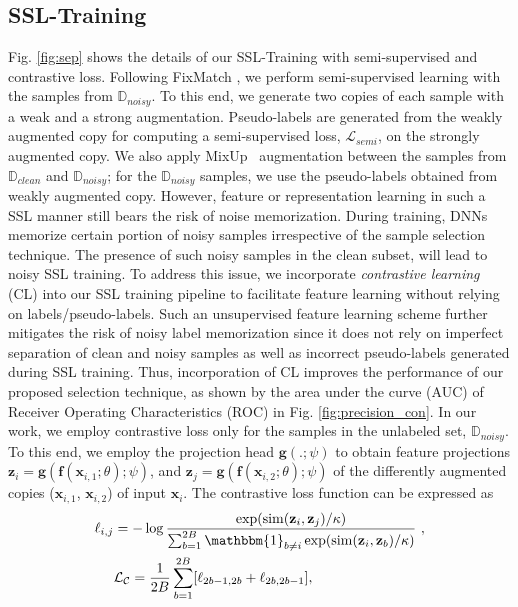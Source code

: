 \documentclass[10pt,twocolumn,letterpaper]{article}
\begin{document}
\subsection{SSL-Training}
\label{sec:ssl_train}
Fig. \ref{fig:sep} shows the details of our SSL-Training with semi-supervised and contrastive loss. Following FixMatch \cite{sohn2020fixmatch}, we perform semi-supervised learning with the samples from $\mathbb{D}_{noisy}$. To this end, we generate two copies of each sample with a weak and a strong augmentation. Pseudo-labels are generated from the weakly augmented copy for computing a semi-supervised loss, $\mathcal{L}_{semi}$, on the strongly augmented copy. We also apply MixUp~\cite{zhang2017mixup} augmentation between the samples from $\mathbb{D}_{clean}$ and $\mathbb{D}_{noisy}$; for the $\mathbb{D}_{noisy}$ samples, we use the pseudo-labels obtained from weakly augmented copy. However, feature or representation learning in such a SSL manner still bears the risk of noise memorization. During training, DNNs memorize certain portion of noisy samples irrespective of the sample selection technique. The presence of such noisy samples in the clean subset, will lead to noisy SSL training. To address this issue, we incorporate \emph{contrastive learning} (CL) \cite{chen2020simple, khosla2020supervised} into our SSL training pipeline to facilitate feature learning without relying on labels/pseudo-labels. Such an unsupervised feature learning scheme further mitigates the risk of noisy label memorization since it does not rely on imperfect separation of clean and noisy samples as well as incorrect pseudo-labels generated during SSL training. Thus, incorporation of CL improves the performance of our proposed selection technique, as shown by the area under the curve (AUC) of Receiver Operating Characteristics (ROC) in Fig. \ref{fig:precision_con}. In our work, we employ contrastive loss only for the samples in the unlabeled set, $\mathbb{D}_{noisy}$. To this end, we employ the projection head $\mathbf{g}(.;\psi)$ to obtain feature projections $\mathbf{z}_{i} = \mathbf{g}(\mathbf{f}({\mathbf{x}}_{i,1}; \theta); \psi)$, and $\mathbf{z}_{j} = \mathbf{g}(\mathbf{f}({\mathbf{x}}_{i,2}; \theta); \psi)$ of the differently augmented copies (${\mathbf{x}}_{i,1}$, ${\mathbf{x}}_{i,2}$) of input  ${\mathbf{x}}_{i}$. The contrastive loss function \cite{chen2020simple,khosla2020supervised} can be expressed as
\begin{align}
        \ell_{i,j}  & = -\log \frac{\exp(\mathrm{sim}(\mathbf{z}_{i}, \mathbf{z}_{j})/\kappa)}{\sum_{b=1}^{2B} \mathbbm{1}_{b \neq i}\exp(\mathrm{sim}(\mathbf{z}_i, \mathbf{z}_b)/\kappa)}~, \\
        & \mathcal{L}_\mathcal{C}= \frac{1}{2B}\sum_{b=1}^{2B}[\ell_{2b-1,2b} + \ell_{2b,2b-1}] \label{eq:loss},
\end{align}
\end{document}
